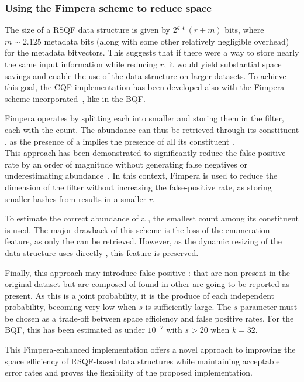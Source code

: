 \subsubsection{Using the Fimpera scheme to reduce space}
The size of a RSQF data structure is given by $2^q * (r + m )$ bits, where $m \sim 2.125$ metadata bits (along with some other relatively negligible overhead) for the metadata bitvectors. This suggests that if there were a way to store nearly the same input information while reducing $r$, it would yield substantial space savings and enable the use of the data structure on larger datasets. To achieve this goal, the CQF implementation has been developed also with the Fimpera scheme incorporated~\cite{fimpera}, like in the BQF.

Fimpera operates by splitting each \kmer into smaller \smer and storing them in the filter, each with the \kmer count. The \kmer abundance can thus be retrieved through its constituent \smers, as the presence of a \kmer implies the presence of all its constituent \smers.\\
This approach has been demonstrated to significantly reduce the false-positive rate by an order of magnitude without generating false negatives or underestimating \kmer abundance~\cite{fimpera}. In this context, Fimpera is used to reduce the dimension of the filter without increasing the false-positive rate, as storing smaller hashes from \smers results in a smaller $r$.

To estimate the correct abundance of a \kmer, the smallest count among its constituent \smers is used.
The major drawback of this scheme is the loss of the \kmer enumeration feature, as only the \smers can be retrieved. However, as the dynamic resizing of the data structure uses directly \smers, this feature is preserved.

Finally, this approach may introduce false positive \kmers: \kmers that are non present in the original dataset but are composed of \smers found in other \kmers are going to be reported as present. As this is a joint probability, it is the produce of each independent probability, becoming very low when $s$ is sufficiently large. The $s$ parameter must be chosen as a trade-off between space efficiency and false positive rates. For the BQF, this has been estimated as under $10^{-7}$ with $s > 20$ when $k = 32$.

This Fimpera-enhanced implementation offers a novel approach to improving the space efficiency of RSQF-based data structures while maintaining acceptable error rates and proves the flexibility of the proposed implementation.

